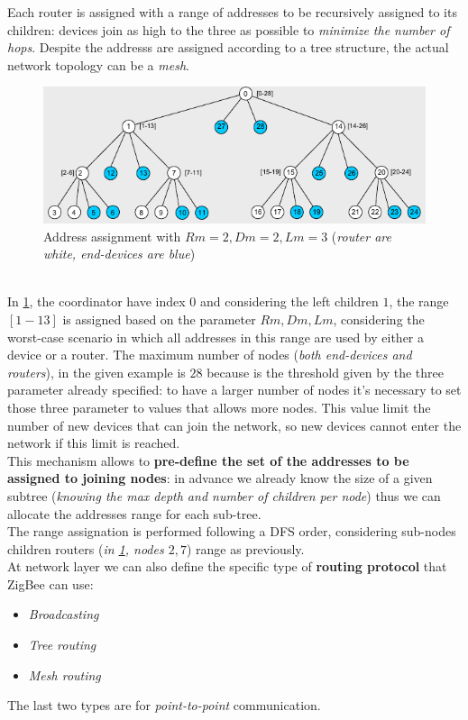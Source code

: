 \documentclass[10pt,a4paper]{report}
\theoremstyle{definition}
\begin{document}
	Each router is assigned with a range of addresses to be recursively assigned to its children: devices join as high to the three as possible to \textit{minimize the number of hops}. Despite the addresss are assigned according to a tree structure, the actual network topology can be a \textit{mesh}.
	\begin{figure}[h]
		\centering\includegraphics[scale=0.60]{images/Pasted image 20230523172036.png}
		\caption{Address assignment with $Rm = 2, Dm=2, Lm=3$ (\textit{router are white, end-devices are blue})}
		\label{three-based-addressing-assignation}
	\end{figure}\\
In \ref{three-based-addressing-assignation}, the coordinator have index $0$ and considering the left children $1$, the range $[1-13]$ is assigned based on the parameter $Rm, Dm, Lm$, considering the worst-case scenario in which all addresses in this range are used by either a device or a router. The maximum number of nodes (\textit{both end-devices and routers}), in the given example is $28$ because is the threshold given by the three parameter already specified: to have a larger number of nodes it's necessary to set those three parameter to values that allows more nodes. This value limit the number of new devices that can join the network, so new devices cannot enter the network if this limit is reached.\\
This mechanism allows to \textbf{pre-define the set of the addresses to be assigned to joining nodes}: in advance we already know the size of a given subtree (\textit{knowing the max depth and number of children per node}) thus we can allocate the addresses range for each sub-tree.\\
The range assignation is performed following a DFS order, considering sub-nodes children routers (\textit{in \ref{three-based-addressing-assignation}, nodes $2,7$}) range as previously.\\
At network layer we can also define the specific type of \textbf{routing protocol} that ZigBee can use:
\begin{itemize}
	\item 
	\textit{Broadcasting}
	\item 
	\textit{Tree routing}
	\item 
	\textit{Mesh routing}

\end{itemize}
The last two types are for \textit{point-to-point} communication.
\end{document}
